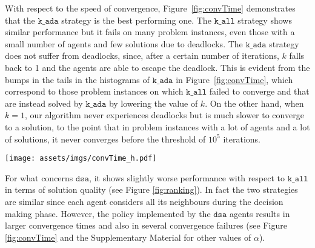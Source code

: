 With respect to the speed of convergence, Figure~\ref{fig:convTime} demonstrates that the $\texttt{k\_ada}$ strategy is the best performing one. The $\texttt{k\_all}$ strategy shows similar performance but it fails on many problem instances, even those with a small number of agents and few solutions due to deadlocks. 
The $\texttt{k\_ada}$ strategy does not suffer from deadlocks, since, after a certain number of iterations, $k$ falls back to 1 and the agents are able to escape the deadlock. This is evident from the bumps in the tails in the histograms of $\texttt{k\_ada}$ in Figure~\ref{fig:convTime}, which correspond to those problem instances on which $\texttt{k\_all}$ failed to converge and that are instead solved by $\texttt{k\_ada}$ by lowering the value of $k$. On the other hand, when $k=1$, our algorithm never experiences deadlocks but is much slower to converge to a solution, to the point that in problem instances with a lot of agents and a lot of solutions, it never converges before the threshold of $10^5$ iterations.

\begin{figure*}[!t]
    \centering
    \texttt{[image: assets/imgs/convTime\_h.pdf]}
    \caption{Distribution of convergence times (in terms of number of iterations) per type of agent on problem instances grouped by number of agents $n$ and by minimum number of solutions $n_{sol}$ we require the problem instance to have. For each of the 100 problem instances characterised by $n$ and $n_{sol}$, we performed $100$ executions of our algorithm for each agent type. Each execution has an upper bound of $10^5$ iterations, beyond which it fails.}
    \label{fig:convTime}
\end{figure*}

For what concerns $\texttt{dsa}$, it shows slightly worse performance with respect to $\texttt{k\_all}$ in terms of solution quality (see Figure \ref{fig:ranking}). In fact the two strategies are similar since each agent considers all its neighbours during the decision making phase. However, the policy implemented by the $\texttt{dsa}$ agents results in larger convergence times and also in several convergence failures (see Figure \ref{fig:convTime} and the Supplementary Material for other values of $\alpha$).

